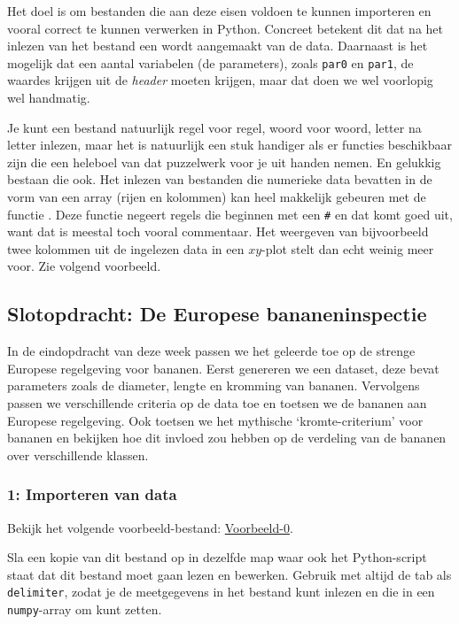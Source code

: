 \documentclass[a4paper,11pt, fleqn]{article}
\begin{document}
Het doel is om bestanden die aan deze eisen voldoen te kunnen importeren en vooral correct te kunnen verwerken in Python. Concreet betekent dit dat na het inlezen van het bestand een  wordt aangemaakt van de data. Daarnaast is het mogelijk dat een aantal variabelen (de parameters), zoals \verb.par0. en \verb.par1., de waardes krijgen uit de \textit{header} moeten krijgen, maar dat doen we wel voorlopig wel handmatig.

Je kunt een bestand natuurlijk regel voor regel, woord voor woord, letter na letter inlezen, maar het is natuurlijk een stuk handiger als er functies beschikbaar zijn die een heleboel van dat puzzelwerk voor je uit handen nemen. En gelukkig bestaan die ook. 
Het inlezen van bestanden die numerieke data bevatten in de vorm van een array (rijen en kolommen) kan heel makkelijk gebeuren met de  functie . Deze functie negeert regels die beginnen met een \verb,#, en dat komt goed uit, want dat is meestal toch vooral commentaar. Het weergeven van bijvoorbeeld twee kolommen uit de ingelezen data in een $xy$-plot stelt dan echt weinig meer voor. Zie volgend voorbeeld.
 

\subsection{Slotopdracht: De Europese bananeninspectie}
In de eindopdracht van deze week passen we het geleerde toe op de strenge Europese regelgeving voor bananen. Eerst genereren we een dataset, deze bevat parameters zoals de diameter, lengte en kromming van bananen. Vervolgens passen we verschillende criteria op de data toe en toetsen we de bananen aan Europese regelgeving. Ook toetsen we het mythische `kromte-criterium' voor bananen en bekijken hoe dit invloed zou hebben op de verdeling van de bananen over verschillende klassen.

\subsubsection*{1: Importeren van data}
Bekijk het volgende voorbeeld-bestand: 
\href{http://nspracticum.science.uu.nl/DATA2020/DATA-Py/Databestanden/vb1.txt}{Voorbeeld-0}.

Sla een kopie van dit bestand op in dezelfde map waar ook het Python-script staat dat dit bestand moet gaan lezen en bewerken.
Gebruik  met altijd de tab als \verb,delimiter,, zodat je de meetgegevens in het bestand kunt inlezen en die in een \verb,numpy,-array om kunt zetten.
\end{document}
